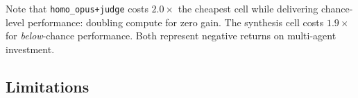 \documentclass[10pt,twocolumn]{article}
\theoremstyle{remark}
\begin{document}
\begin{table}[t]
  \centering
  \caption{Relative cost vs.\ quality across experimental cells ($1.0\times$ = cheapest cell). \texttt{diverse\_mixed+judge} is both the best-performing and cheapest configuration. $^\dagger$Exploratory (not pre-registered).}
  \label{tab:cost}
\end{table}

Note that \texttt{homo\_opus+judge} costs $2.0\times$ the cheapest cell while delivering chance-level performance: doubling compute for zero gain. The synthesis cell costs $1.9\times$ for \emph{below}-chance performance. Both represent negative returns on multi-agent investment.

\subsection{Limitations}
\label{sec:limitations}
\end{document}
